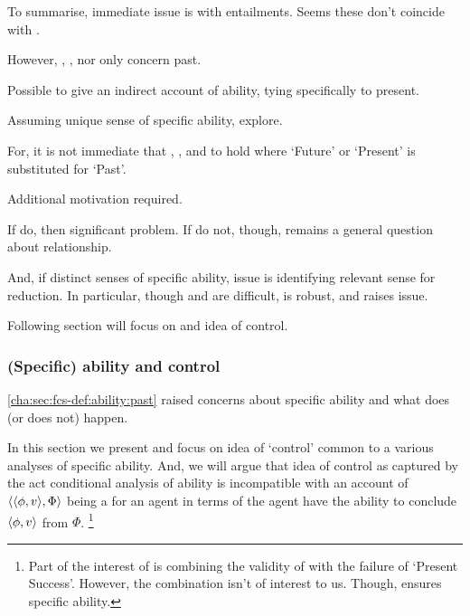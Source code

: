 \begin{note}
  To summarise, immediate issue is with entailments.
  Seems these don't coincide with \fc{}.

  However, \BoyPS{}, \BoyPSC{}, nor \BoyPSCQC{} only concern past.

  Possible to give an indirect account of ability, tying specifically to present.

  Assuming unique sense of specific ability, explore.

  For, it is not immediate that \BoyPS{}, \BoyPSC{}, and \BoyPSCQC{} to hold where `Future' or `Present' is substituted for `Past'.

  Additional motivation required.

  If do, then significant problem.
  If do not, though, remains a general question about relationship.

  And, if distinct senses of specific ability, issue is identifying relevant sense for reduction.
  In particular, though \BoyPS{} and \BoyPSCQC{} are difficult, \BoyPSC{} is robust, and raises issue.

  Following section will focus on \BoyPS{} and idea of control.
\end{note}

\subsubsection{(Specific) ability and control}
\label{cha:sec:fcs-def:ability:control-intuition}

\begin{note}[Segue]
  \autoref{cha:sec:fcs-def:ability:past} raised concerns about specific ability and what does (or does not) happen.

  In this section we present and focus on idea of `control' common to a various analyses of specific ability.
  And, we will argue that idea of control as captured by the act conditional analysis of ability is incompatible with an account of \(\langle \langle \phi, v \rangle, \Phi \rangle\) being a  for an agent in terms of the agent have the ability to conclude \(\langle \phi, v \rangle\) from \(\Phi\).%
  \footnote{
    Part of the interest of \textcite{Boylan:2020aa} is combining the validity of \BoyPS{} with the failure of `Present Success'.
    However, the combination isn't of interest to us.
    Though, ensures specific ability.
  }
\end{note}

